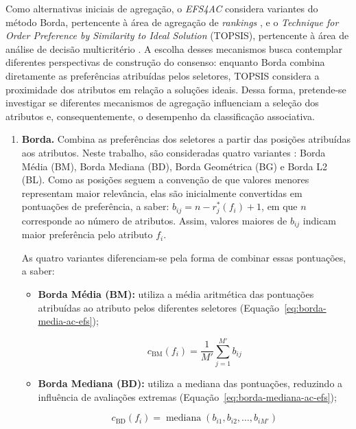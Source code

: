 Como alternativas iniciais de agregação, o \textit{EFS4AC} considera variantes do método Borda, pertencente à área de agregação de \textit{rankings} \cite{ijcai2024p915}, e o \textit{Technique for Order Preference by Similarity to Ideal Solution} (TOPSIS), pertencente à área de análise de decisão multicritério \cite{WATROBSKI2019107}. A escolha desses mecanismos busca contemplar diferentes perspectivas de construção do consenso: enquanto Borda combina diretamente as preferências atribuídas pelos seletores, TOPSIS considera a proximidade dos atributos em relação a soluções ideais. Dessa forma, pretende-se investigar se diferentes mecanismos de agregação influenciam a seleção dos atributos e, consequentemente, o desempenho da classificação associativa.

\begin{enumerate}
    \item \textbf{Borda.} Combina as preferências dos seletores a partir das posições atribuídas aos atributos. Neste trabalho, são consideradas quatro variantes \cite{10.1093/bib/bbx101}: Borda Média (BM), Borda Mediana (BD), Borda Geométrica (BG) e Borda L2 (BL). Como as posições seguem a convenção de que valores menores representam maior relevância, elas são inicialmente convertidas em pontuações de preferência, a saber: $b_{ij}=n-r_j^{*}(f_i)+1$, em que $n$ corresponde ao número de atributos. Assim, valores maiores de $b_{ij}$ indicam maior preferência pelo atributo $f_i$.

    As quatro variantes diferenciam-se pela forma de combinar essas pontuações, a saber:

    \begin{itemize}
        \item \textbf{Borda Média (BM):} utiliza a média aritmética das pontuações atribuídas ao atributo pelos diferentes seletores (Equação~\ref{eq:borda-media-ac-efs});

        \begin{equation}\label{eq:borda-media-ac-efs}
            c_{\mathrm{BM}}(f_i)
            =
            \frac{1}{M'}
            \sum_{j=1}^{M'} b_{ij}
        \end{equation}

        \item \textbf{Borda Mediana (BD):} utiliza a mediana das pontuações, reduzindo a influência de avaliações extremas (Equação~\ref{eq:borda-mediana-ac-efs});

        \begin{equation}\label{eq:borda-mediana-ac-efs}
            c_{\mathrm{BD}}(f_i)
            =
            \operatorname{mediana}
            \left(b_{i1},b_{i2},\ldots,b_{iM'}\right)
        \end{equation}


\end{itemize}
\end{enumerate}
